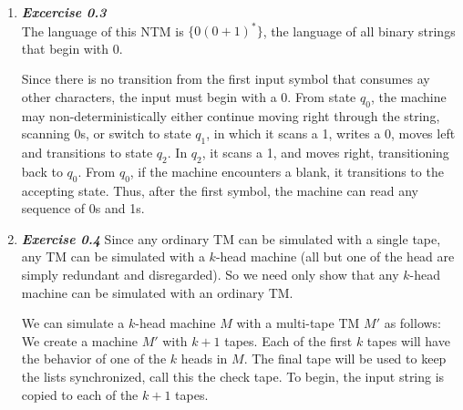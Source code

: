 \documentclass[a4paper]{article}
\begin{document}
\begin{enumerate}
\item\emph{\textbf{Excercise 0.3}} \\
The language of this NTM is $\{0(0+1)^\ast\}$, the language of all binary strings that begin with 0.

Since there is no transition from the first input symbol that consumes ay other characters, the input must begin with a 0. From state $q_0$, the machine may non-deterministically either continue moving right through the string, scanning 0s, or switch to state $q_1$, in which it scans a 1, writes a 0, moves left and transitions to state $q_2$. In $q_2$, it scans a 1, and moves right, transitioning back to $q_0$. From $q_0$, if the machine encounters a blank, it transitions to the accepting state. Thus, after the first symbol, the machine can read any sequence of 0s and 1s. \\






\item \emph{\textbf{Exercise 0.4}}
Since any ordinary TM can be simulated with a single tape, any TM can be simulated with a $k$-head machine (all but one of the head are simply redundant and disregarded). So we need only show that any $k$-head machine can be simulated with an ordinary TM.

We can simulate a $k$-head machine $M$ with a multi-tape TM $M'$ as follows: \\
We create a machine $M'$ with $k+1$ tapes. Each of the first $k$ tapes will have the behavior of one of the $k$ heads in $M$. The final tape will be used to keep the lists synchronized, call this the check tape. To begin, the input string is copied to each of the $k+1$ tapes. 


\end{enumerate}
\end{document}
